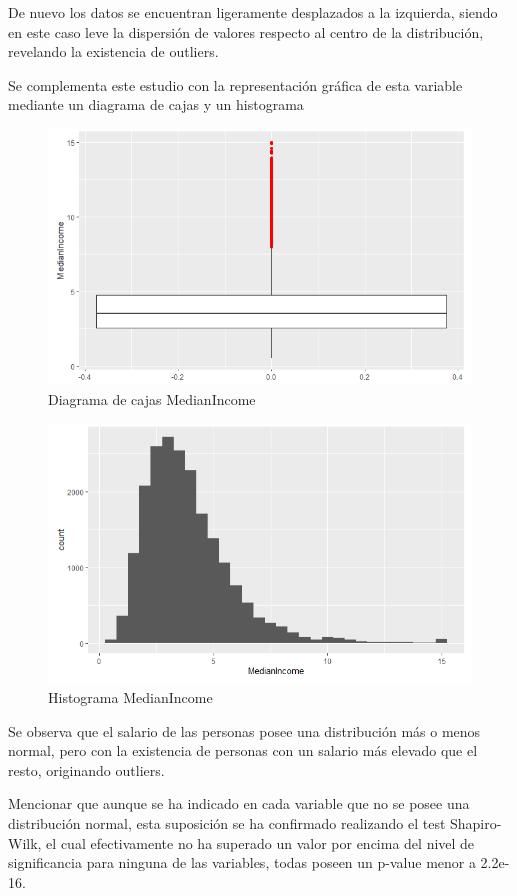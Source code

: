 \begin{itemize}
De nuevo los datos se encuentran ligeramente desplazados a la izquierda, siendo en este caso leve la dispersión de valores respecto al centro de la distribución, revelando la existencia de outliers.

Se complementa este estudio con la representación gráfica de esta variable mediante un diagrama de cajas y un histograma

\begin{figure}[h!]
	\centering
	\includegraphics[width=0.7\linewidth]{figures/eda_box_8}
	\caption{Diagrama de cajas MedianIncome}
	\label{fig:edabox8}
\end{figure}
\newpage
\begin{figure}[h!]
	\centering
	\includegraphics[width=0.7\linewidth]{figures/eda_hist_8}
	\caption{Histograma MedianIncome}
	\label{fig:edahist8}
\end{figure}


Se observa que el salario de las personas posee una distribución más o menos normal, pero con la existencia de personas con un salario más elevado que el resto, originando outliers.\\


	
\end{itemize}

Mencionar que aunque se ha indicado en cada variable que no se posee una distribución normal, esta suposición se ha confirmado realizando el test Shapiro-Wilk, el cual efectivamente no ha superado un valor por encima del nivel de significancia para ninguna de las variables, todas poseen un p-value menor a 2.2e-16. \\


